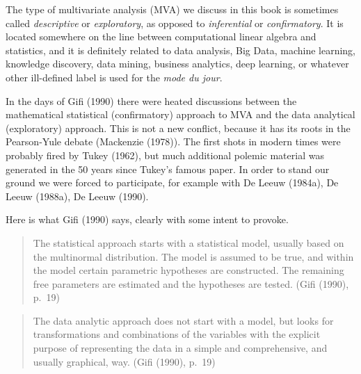 \documentclass[
  12pt,
  letterpaper,
  DIV=11,
  numbers=noendperiod]{scrreprt}
\begin{document}
The type of multivariate analysis (MVA) we discuss in this book is
sometimes called \emph{descriptive} or \emph{exploratory}, as opposed to
\emph{inferential} or \emph{confirmatory}. It is located somewhere on
the line between computational linear algebra and statistics, and it is
definitely related to data analysis, Big Data, machine learning,
knowledge discovery, data mining, business analytics, deep learning, or
whatever other ill-defined label is used for the \emph{mode du jour}.

In the days of Gifi (1990) there were heated discussions between the
mathematical statistical (confirmatory) approach to MVA and the data
analytical (exploratory) approach. This is not a new conflict, because
it has its roots in the Pearson-Yule debate (Mackenzie (1978)). The
first shots in modern times were probably fired by Tukey (1962), but
much additional polemic material was generated in the 50 years since
Tukey's famous paper. In order to stand our ground we were forced to
participate, for example with De Leeuw (1984a), De Leeuw (1988a), De
Leeuw (1990).

Here is what Gifi (1990) says, clearly with some intent to provoke.

\begin{quote}
The statistical approach starts with a statistical model, usually based
on the multinormal distribution. The model is assumed to be true, and
within the model certain parametric hypotheses are constructed. The
remaining free parameters are estimated and the hypotheses are tested.
(Gifi (1990), p.~19)
\end{quote}

\begin{quote}
The data analytic approach does not start with a model, but looks for
transformations and combinations of the variables with the explicit
purpose of representing the data in a simple and comprehensive, and
usually graphical, way. (Gifi (1990), p.~19)
\end{quote}
\end{document}
